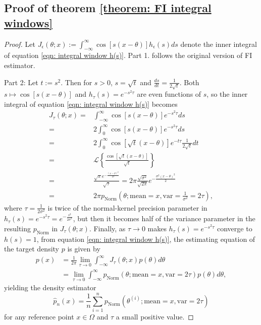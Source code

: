 \documentclass[%
 reprint,
 amsmath,amssymb,
 aps,
]{revtex4-2}
\begin{document}
\subsection{Proof of theorem \ref{theorem: FI integral windows}}
\begin{proof}
    Let $\displaystyle J_\epsilon(\theta; x) := \int_{-\infty}^\infty \cos[s(x-\theta)]h_\epsilon(s)ds$ denote the inner integral of equation \eqref{eqn: integral window h(s)}. Part 1. follows the original version of FI estimator.

    Part 2: Let $t := s^2$. Then for $s > 0$, $s = \sqrt{t}$ and $\frac{ds}{dt} = \frac{1}{2\sqrt{t}}$. Both $s \mapsto \cos[s(x - \theta)]$ and $\displaystyle h_\tau(s) = e^{-s^2\tau}$ are even functions of $s$, so the inner integral of equation \eqref{eqn: integral window h(s)} becomes
    \begin{align*}
        J_\tau(\theta; x) = & \int_{-\infty}^\infty \cos[s(x - \theta)]e^{-s^2\tau}ds \\
        = & 2\int_0^\infty \cos[s(x - \theta)]e^{-s^2\tau}ds \\
        = & 2\int_0^\infty \cos[\sqrt{t}(x - \theta)]e^{-t\tau}\frac{1}{2\sqrt{t}}dt \\
        = & \mathcal{L}\left\{\frac{\cos[\sqrt{t}(x - \theta)]}{\sqrt{t}} \right\} \\
        = & \frac{\sqrt{\pi}e^{-\frac{(x - \theta)^2}{4\tau}}}{\sqrt{\tau}} = 2\pi\frac{\sqrt{\sigma^2}}{\sqrt{2\pi}}e^{-\frac{\sigma^2(x - \theta)^2}{2}} \\
        = & 2\pi p_\text{Norm}(\theta; \text{mean} = x, \text{var} = \frac{1}{\sigma^2} = 2\tau),
    \end{align*}
    where $\tau = \frac{1}{2\sigma^2}$ is twice of the normal-kernel precision parameter in $\displaystyle h_\tau(s) = e^{-s^2\tau} = e^{-\frac{s^2}{2\sigma^2}}$, but then it becomes half of the variance parameter in the resulting $p_\text{Norm}$ in $J_\tau(\theta; x)$. Finally, as $\tau \to 0$ makes $\displaystyle h_\tau(s) = e^{-s^2\tau}$ converge to $h(s) = 1$, from equation \eqref{eqn: integral window h(s)}, the estimating equation of the target density $p$ is given by
    \begin{align*}
        p(x) & = \frac{1}{2\pi} \lim_{\tau \to 0} \int_{-\infty}^\infty J_\tau(\theta; x) p(\theta)d\theta \\
        & = \lim_{\tau \to 0} \int_{-\infty}^\infty p_\text{Norm}(\theta; \text{mean} = x, \text{var} = 2\tau) p(\theta)d\theta,
    \end{align*}
    yielding the density estimator
    \begin{equation*}
        \hat{p}_n(x) = \frac{1}{n} \sum_{i = 1}^n p_\text{Norm}(\theta^{(i)}; \text{mean} = x, \text{var} = 2\tau)
    \end{equation*}
    for any reference point $x \in \Omega$ and $\tau$ a small positive value.


\end{proof}
\end{document}
